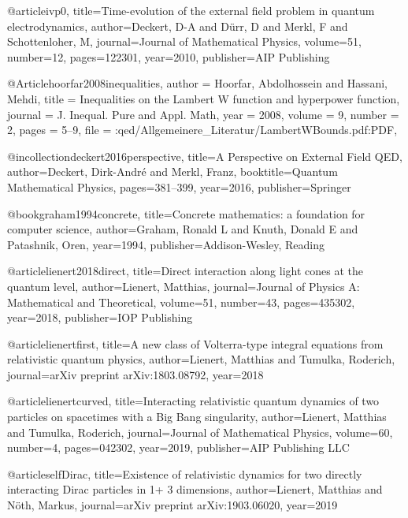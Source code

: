 @article{ivp0,
  title={Time-evolution of the external field problem in quantum electrodynamics},
  author={Deckert, D-A and D{\"u}rr, D and Merkl, F and Schottenloher, M},
  journal={Journal of Mathematical Physics},
  volume={51},
  number={12},
  pages={122301},
  year={2010},
  publisher={AIP Publishing}
}


@Article{hoorfar2008inequalities,
  author  = {Hoorfar, Abdolhossein and Hassani, Mehdi},
  title   = {Inequalities on the Lambert W function and hyperpower function},
  journal = {J. Inequal. Pure and Appl. Math},
  year    = {2008},
  volume  = {9},
  number  = {2},
  pages   = {5--9},
  file    = {:qed/Allgemeinere_Literatur/LambertWBounds.pdf:PDF},
}



@incollection{deckert2016perspective,
  title={A Perspective on External Field QED},
  author={Deckert, Dirk-Andr{\'e} and Merkl, Franz},
  booktitle={Quantum Mathematical Physics},
  pages={381--399},
  year={2016},
  publisher={Springer}
}

@book{graham1994concrete,
  title={Concrete mathematics: a foundation for computer science},
  author={Graham, Ronald L and Knuth, Donald E and Patashnik, Oren},
  year={1994},
  publisher={Addison-Wesley, Reading}
}

@article{lienert2018direct,
  title={Direct interaction along light cones at the quantum level},
  author={Lienert, Matthias},
  journal={Journal of Physics A: Mathematical and Theoretical},
  volume={51},
  number={43},
  pages={435302},
  year={2018},
  publisher={IOP Publishing}
}



@article{lienertfirst,
  title={A new class of Volterra-type integral equations from relativistic quantum physics},
  author={Lienert, Matthias and Tumulka, Roderich},
  journal={arXiv preprint arXiv:1803.08792},
  year={2018}
}

@article{lienertcurved,
  title={Interacting relativistic quantum dynamics of two particles on spacetimes with a Big Bang singularity},
  author={Lienert, Matthias and Tumulka, Roderich},
  journal={Journal of Mathematical Physics},
  volume={60},
  number={4},
  pages={042302},
  year={2019},
  publisher={AIP Publishing LLC}
}

@article{selfDirac,
  title={Existence of relativistic dynamics for two directly interacting Dirac particles in 1+ 3 dimensions},
  author={Lienert, Matthias and N{\"o}th, Markus},
  journal={arXiv preprint arXiv:1903.06020},
  year={2019}
}



